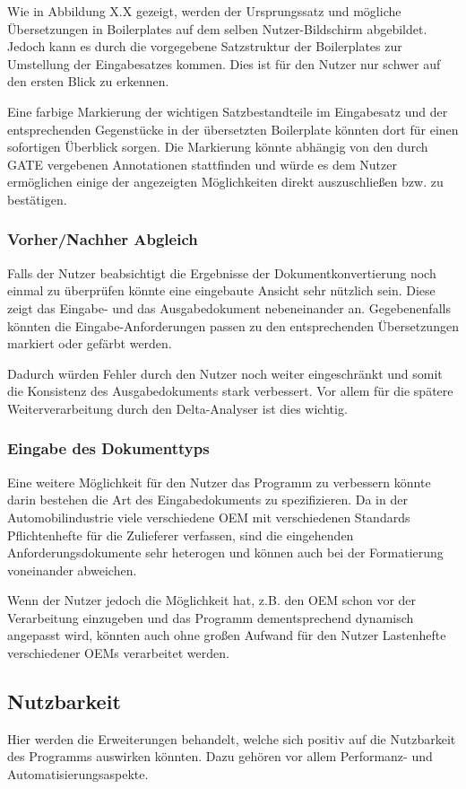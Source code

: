\documentclass[12pt]{report}
\begin{document}
Wie in Abbildung X.X gezeigt, werden der Ursprungssatz und mögliche Übersetzungen in Boilerplates auf dem selben Nutzer-Bildschirm abgebildet. Jedoch kann es durch die vorgegebene Satzstruktur der Boilerplates zur Umstellung der Eingabesatzes kommen. Dies ist für den Nutzer nur schwer auf den ersten Blick zu erkennen.

Eine farbige Markierung der wichtigen Satzbestandteile im Eingabesatz und der entsprechenden Gegenstücke in der übersetzten Boilerplate könnten dort für einen sofortigen Überblick sorgen. Die Markierung könnte abhängig von den durch GATE vergebenen Annotationen stattfinden und würde es dem Nutzer ermöglichen einige der angezeigten Möglichkeiten direkt auszuschließen bzw. zu bestätigen.

\subsubsection{Vorher/Nachher Abgleich}
Falls der Nutzer beabsichtigt die Ergebnisse der Dokumentkonvertierung noch einmal zu überprüfen könnte eine eingebaute Ansicht sehr nützlich sein. Diese zeigt das Eingabe- und das Ausgabedokument nebeneinander an. Gegebenenfalls könnten die Eingabe-Anforderungen passen zu den entsprechenden Übersetzungen markiert oder gefärbt werden. 

Dadurch würden Fehler durch den Nutzer noch weiter eingeschränkt und somit die Konsistenz des Ausgabedokuments stark verbessert. Vor allem für die spätere Weiterverarbeitung durch den Delta-Analyser ist dies wichtig. 

\subsubsection{Eingabe des Dokumenttyps}
Eine weitere Möglichkeit für den Nutzer das Programm zu verbessern könnte darin bestehen die Art des Eingabedokuments zu spezifizieren. Da in der Automobilindustrie viele verschiedene OEM mit verschiedenen Standards Pflichtenhefte für die Zulieferer verfassen, sind die eingehenden Anforderungsdokumente sehr heterogen und können auch bei der Formatierung voneinander abweichen. 

Wenn der Nutzer jedoch die Möglichkeit hat, z.B. den OEM schon vor der Verarbeitung einzugeben und das Programm dementsprechend dynamisch angepasst wird, könnten auch ohne großen Aufwand für den Nutzer Lastenhefte verschiedener OEMs verarbeitet werden. 

\subsection{Nutzbarkeit}
Hier werden die Erweiterungen behandelt, welche sich positiv auf die Nutzbarkeit des Programms auswirken könnten. Dazu gehören vor allem Performanz- und Automatisierungsaspekte.
\end{document}
